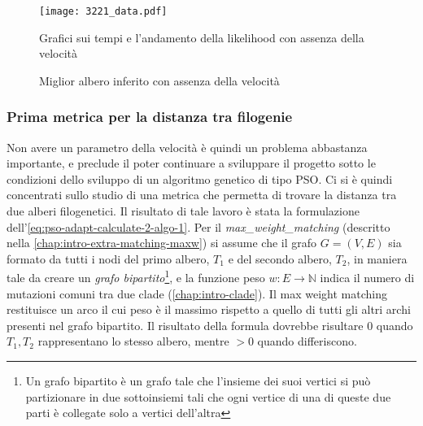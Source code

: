 \begin{figure}[!h]
  \centering
  \texttt{[image: 3221\_data.pdf]}
  \caption{Grafici sui tempi e l'andamento della likelihood con assenza della velocità}
  \label{fig:pso-adapt-calculate-4-data}
\end{figure}
\begin{figure}[!h]
  \centering
  \caption{Miglior albero inferito con assenza della velocità}
  \label{fig:pso-adapt-calculate-1-tree}
\end{figure}

\subsubsection{Prima metrica per la distanza tra filogenie}
\label{chap:pso-adapt-calculate-2}
Non avere un parametro della velocità è quindi un problema abbastanza importante, e preclude il poter continuare a sviluppare il progetto sotto le condizioni dello sviluppo di un algoritmo genetico di tipo PSO.
Ci si è quindi concentrati sullo studio di una metrica che permetta di trovare la distanza tra due alberi filogenetici. Il risultato di tale lavoro è stata la formulazione dell'\autoref{eq:pso-adapt-calculate-2-algo-1}. Per il \textit{max\_weight\_matching} (descritto nella \autoref{chap:intro-extra-matching-maxw}) si assume che il grafo $G = (V, E)$ sia formato da tutti i nodi del primo albero, $T_1$ e del secondo albero, $T_2$, in maniera tale da creare un \textit{grafo bipartito}\footnote{Un grafo bipartito è un grafo tale che l'insieme dei suoi vertici si può partizionare in due sottoinsiemi tali che ogni vertice di una di queste due parti è collegate solo a vertici dell'altra}, e la funzione peso $w: E \rightarrow \mathbb{N}$ indica il numero di mutazioni comuni tra due clade (\autoref{chap:intro-clade}). Il max weight matching restituisce un arco il cui peso è il massimo rispetto a quello di tutti gli altri archi presenti nel grafo bipartito. Il risultato della formula dovrebbe risultare $0$ quando $T_1, T_2$ rappresentano lo stesso albero, mentre $> 0$ quando differiscono.

